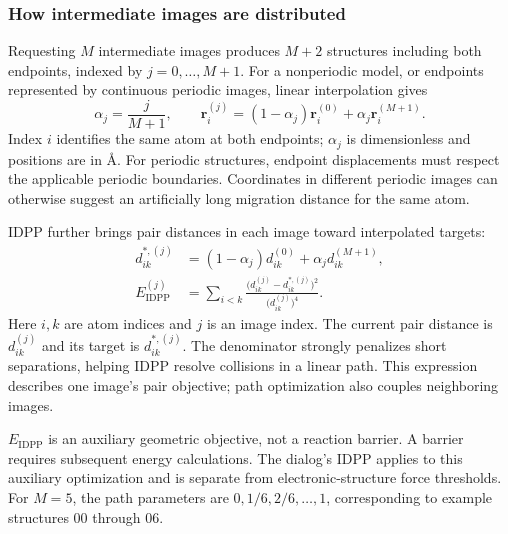 \subsubsection{How intermediate images are distributed}

Requesting $M$ intermediate images produces $M+2$ structures including both endpoints, indexed by $j=0,\ldots,M+1$. For a nonperiodic model, or endpoints represented by continuous periodic images, linear interpolation gives
\begin{equation}
  \alpha_j=\frac{j}{M+1},\qquad
  \mathbf r_i^{(j)}=(1-\alpha_j)\mathbf r_i^{(0)}
     +\alpha_j\mathbf r_i^{(M+1)}.
  \label{eq:neb-image-interpolation}
\end{equation}
Index $i$ identifies the same atom at both endpoints; $\alpha_j$ is dimensionless and positions are in \AA. For periodic structures, endpoint displacements must respect the applicable periodic boundaries. Coordinates in different periodic images can otherwise suggest an artificially long migration distance for the same atom.

IDPP further brings pair distances in each image toward interpolated targets:
\begin{equation}
\begin{aligned}
  d_{ik}^{*,(j)}&=(1-\alpha_j)d_{ik}^{(0)}
                      +\alpha_j d_{ik}^{(M+1)},\\
  E_{\mathrm{IDPP}}^{(j)}&=
    \sum_{i<k}\frac{\bigl(d_{ik}^{(j)}-d_{ik}^{*,(j)}\bigr)^2}
                         {\bigl(d_{ik}^{(j)}\bigr)^4}.
\end{aligned}
\label{eq:idpp-pair-objective}
\end{equation}
Here $i,k$ are atom indices and $j$ is an image index. The current pair distance is $d_{ik}^{(j)}$ and its target is $d_{ik}^{*,(j)}$. The denominator strongly penalizes short separations, helping IDPP resolve collisions in a linear path. This expression describes one image's pair objective; path optimization also couples neighboring images.

$E_{\mathrm{IDPP}}$ is an auxiliary geometric objective, not a reaction barrier. A barrier requires subsequent energy calculations. The dialog's IDPP  applies to this auxiliary optimization and is separate from electronic-structure force thresholds. For $M=5$, the path parameters are $0,1/6,2/6,\ldots,1$, corresponding to example structures 00 through 06.
